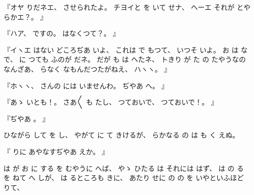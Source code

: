 %
『オヤ
りだネエ、
%
させられたよ。
%
チヨイと
を
いて
せナ、
%
ヘーエ
それが
とやらかエ？。
』

%
『ハア、
%
ですの。
%
はなくつて？。
』

%
『イヽエ
はない
どころぢあ
いよ、
%
これは
で
もつて、
%
いつそ
いよ。
%
お
は
な
で、
%
に
つても
ふのが
だネ。
%
だが
も
は
へたネ、
%
トきり
が
た
の
たやうなのなんざあ、
%
らなく
なもんだつたがねえ、
%
ハヽヽ。
』

%
『ホヽヽ、
%
さんの
には
いませんわ。
%
ぢやあ
へ。
』

%
『あゝ
いとも！。
%
さあ〳〵
も
たし、
%
つておいで、
%
つておいで！。
』

%
『ぢやあ
。
』

%
ひながら
して
を
し、
%
やがて
に
て
きけるが、
らかなる
の
は
も
く
えぬ。

%
『
りに
あやなすぢやあ
えか。
』

%
は
が
お
に
する
を
むやうに
へば、
%
やゝ
ひたる%
は
それには
はず、
%
は
の
る
を
ねて
へ
しが、
%
は
るところも%
きに、
%
あたり
せに
の
の
を
いやといふほど
りて、

